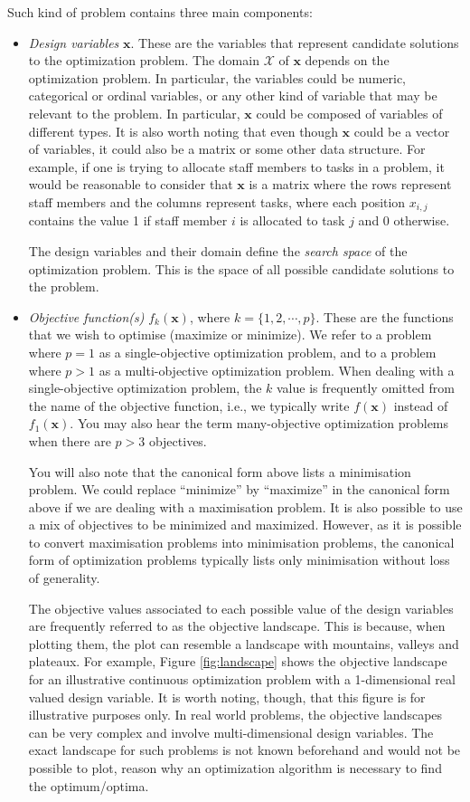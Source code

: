 Such kind of problem contains three main components:
\begin{itemize}
\item \textit{Design variables} $\mathbf{x}$. These are the variables that represent candidate solutions to the optimization problem. The domain $\mathcal{X}$ of $\mathbf{x}$ depends on the optimization problem. In particular, the variables could be numeric, categorical or ordinal variables, or any other kind of variable that may be relevant to the problem. In particular, $\mathbf{x}$ could be composed of variables of different types. It is also worth noting that even though $\mathbf{x}$ could be a vector of variables, it could also be a matrix or some other data structure. For example, if one is trying to allocate staff members to tasks in a problem, it would be reasonable to consider that $\mathbf{x}$ is a matrix where the rows represent staff members and the columns represent tasks, where each position $x_{i,j}$ contains the value 1 if staff member $i$ is allocated to task $j$ and 0 otherwise. 

The design variables and their domain define the \textit{search space} of the optimization problem. This is the space of all possible candidate solutions to the problem.

\item \textit{Objective function(s)} $f_k(\mathbf{x})$, where $k=\{1,2,\cdots,p\}$. These are the functions that we wish to optimise (maximize or minimize). We refer to a problem where $p=1$ as a single-objective optimization problem, and to a problem where $p>1$ as a multi-objective optimization problem. When dealing with a single-objective optimization problem, the $k$ value is frequently omitted from the name of the objective function, i.e., we typically write $f(\mathbf{x})$ instead of $f_1(\mathbf{x})$. You may also hear the term many-objective optimization problems when there are $p>3$ objectives. 

You will also note that the canonical form above lists a minimisation problem. We could replace ``minimize'' by ``maximize'' in the canonical form above if we are dealing with a maximisation problem. It is also possible to use a mix of objectives to be minimized and maximized. However, as it is possible to convert maximisation problems into minimisation problems, the canonical form of optimization problems typically lists only minimisation without loss of generality. 

The objective values associated to each possible value of the design variables are frequently referred to as the objective landscape. This is because, when plotting them, the plot can resemble a landscape with mountains, valleys and plateaux. For example, Figure \ref{fig:landscape} shows the objective landscape for an illustrative continuous optimization problem with a 1-dimensional real valued design variable. It is worth noting, though, that this figure is for illustrative purposes only. In real world problems, the objective landscapes can be very complex and involve multi-dimensional design variables. The exact landscape for such problems is not known beforehand and would not be possible to plot, reason why an optimization algorithm is necessary to find the optimum/optima. 


\end{itemize}
